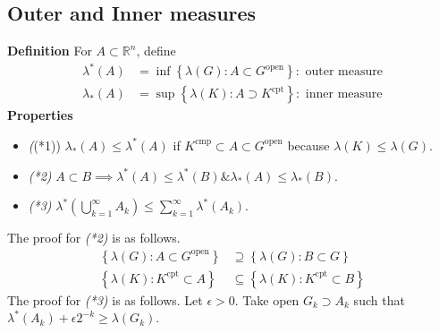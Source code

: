 \documentclass[11pt]{article}
\begin{document}
\subsection{Outer and Inner measures}
\textbf{Definition} For $A \subset \mathbb{R}^{n}$, define 
\begin{align*}
  \lambda^{*}\left(A\right) &= \inf \left\{\lambda\left(G\right): A\subset G^{\text{open}} \right\}:\text{ outer measure}\\
  \lambda_{*}\left(A\right) &= \sup \left\{\lambda\left(K\right): A \supset K^{\text{cpt}} \right\}:\text{ inner measure}
\end{align*}
\textbf{Properties}
\begin{itemize}
  \item \emph((*1)) $\lambda_{*}\left(A\right)\leq \lambda^{*}\left(A\right)$ if $K^{\text{cmp}} \subset A \subset G^{\text{open}}$ because $\lambda\left(K\right) \leq \lambda\left(G\right)$.
  \item \emph{(*2)} $A \subset B  \implies \lambda^{*}\left(A\right) \leq \lambda^{*}\left(B\right) \& \lambda_{*}\left(A\right) \leq \lambda_{*}\left(B\right)$.
  \item \emph{(*3)} $\lambda^{*}\left(\bigcup_{k=1}^{\infty}A_{k}\right) \leq \sum_{k=1}^{\infty}\lambda^{*}\left(A_{k}\right)$.
\end{itemize}
The proof for \emph{(*2)} is as follows.
\begin{align*}
  \left\{\lambda\left(G\right): A \subset G^{\text{open}} \right\} &\supseteq \left\{\lambda\left(G\right): B \subset G \right\}\\
  \left\{\lambda\left(K\right): K^{\text{cpt}} \subset A \right\} &\subseteq \left\{\lambda\left(K\right): K^{\text{cpt}} \subset B \right\}
\end{align*}
The proof for \emph{(*3)} is as follows. Let $\epsilon > 0$. Take open $G_{k} \supset A_{k}$ such that $\lambda^{*}\left(A_{k}\right) + \epsilon 2^{-k} \geq \lambda\left(G_{k}\right)$. 
\end{document}
